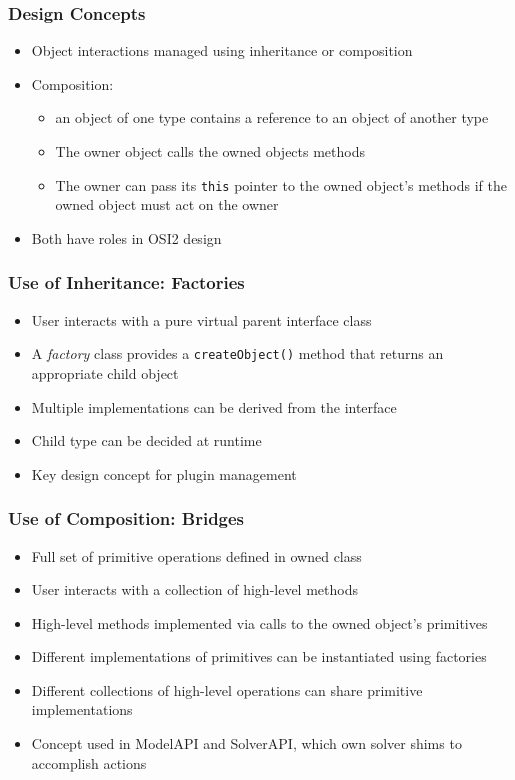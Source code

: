 \documentclass{beamer}
\begin{document}
\begin{frame}
  \frametitle{Design Concepts}

  \begin{itemize}
    \item Object interactions managed using inheritance or
      composition
    \item Composition:
      \begin{itemize}
      \item an object of one type contains a reference to an object
        of another type
      \item The owner object calls the owned objects methods
      \item The owner can pass its \lstinline|this| pointer to the owned
        object's methods if the owned object must act on the owner
      \end{itemize}
    \item Both have roles in OSI2 design
  \end{itemize}
\end{frame}

\begin{frame}
  \frametitle{Use of Inheritance: Factories}
 
  \begin{itemize}
  \item User interacts with a pure virtual parent interface class
  \item A \emph{factory} class provides a \lstinline|createObject()|
    method that returns an appropriate child object
  \item Multiple implementations can be derived from the interface
  \item Child type can be decided at runtime
  \item Key design concept for plugin management
  \end{itemize}
\end{frame}

\begin{frame}
  \frametitle{Use of Composition: Bridges}

  \begin{itemize}
  \item Full set of primitive operations defined in owned class
  \item User interacts with a collection of high-level methods
  \item High-level methods implemented via calls to the owned
    object's primitives
  \item Different implementations of primitives can be instantiated
    using factories
  \item Different collections of high-level operations can share
    primitive implementations
  \item Concept used in ModelAPI and SolverAPI, which own solver
    shims to accomplish actions
  \end{itemize}
\end{frame}
\end{document}
